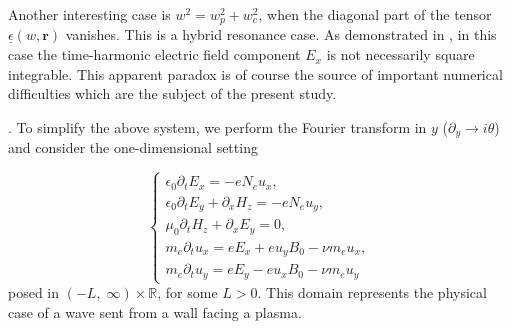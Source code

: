 {Another interesting case is $w^2=w_p^2+w_c^2$, when the diagonal part of the tensor $\underline{\epsilon}(w,\mathbf{r})$ vanishes. 
This is a hybrid resonance case. As demonstrated in  \cite{Despres_2014}, in this case the time-harmonic electric field component $E_x$ is not necessarily square 
integrable. This apparent paradox is of course the source of important numerical difficulties which are the subject of the present study.
}


.
To simplify the above system, we perform the Fourier transform in $y$ ($\partial_y\rightarrow i\theta$) and consider the one-dimensional setting

\begin{equation}
\label{eq:main_model}
\begin{cases}
\epsilon_0\partial_t E_{x}=-eN_e u_x,\\
\epsilon_0\partial_t E_{y}+\partial_x H_z=-eN_e u_y,\\
\mu_0\partial_t H_z+\partial_x E_y =0,\\
m_e\partial_t u_x=eE_x+eu_yB_0-\nu m_e u_x,\\
m_e\partial_t u_y=eE_y-eu_xB_0-\nu m_e u_y
\end{cases}
\end{equation}
posed in $(-L,\; \infty)\times \mathbb{R}$, for some $L>0$. This domain represents the physical case of a wave sent from a wall facing a plasma. 


